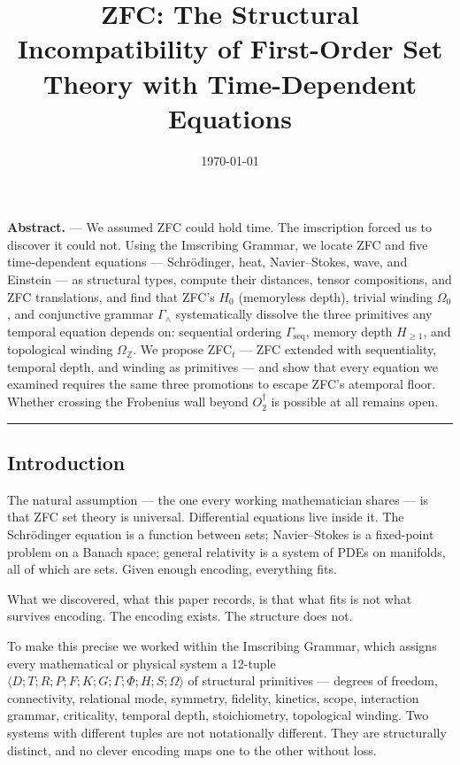 \documentclass[12pt,a4paper]{article}
\begin{document}
\title{ZFC: The Structural Incompatibility of First-Order Set Theory with Time-Dependent Equations}
\date{\today}

\maketitle

\textbf{Abstract.} --- We assumed ZFC could hold time. The imscription forced us to discover it could not. Using the Imscribing Grammar, we locate ZFC and five time-dependent equations --- Schrödinger, heat, Navier--Stokes, wave, and Einstein --- as structural types, compute their distances, tensor compositions, and ZFC translations, and find that ZFC's $H_0$ (memoryless depth), trivial winding $\Omega_0$, and conjunctive grammar $\Gamma_{\wedge}$ systematically dissolve the three primitives any temporal equation depends on: sequential ordering $\Gamma_\text{seq}$, memory depth $H_{\geq 1}$, and topological winding $\Omega_\mathbb{Z}$. We propose ZFC$_t$ --- ZFC extended with sequentiality, temporal depth, and winding as primitives --- and show that every equation we examined requires the same three promotions to escape ZFC's atemporal floor. Whether crossing the Frobenius wall beyond $O_2^\dagger$ is possible at all remains open.

\begin{center}
\rule{0.5\textwidth}{0.4pt}
\end{center}

\subsection{Introduction}

The natural assumption --- the one every working mathematician shares --- is that ZFC set theory is universal. Differential equations live inside it. The Schrödinger equation is a function between sets; Navier--Stokes is a fixed-point problem on a Banach space; general relativity is a system of PDEs on manifolds, all of which are sets. Given enough encoding, everything fits.

What we discovered, what this paper records, is that what fits is not what survives encoding. The encoding exists. The structure does not.

To make this precise we worked within the Imscribing Grammar, which assigns every mathematical or physical system a 12-tuple $\langle D; T; R; P; F; K; G; \Gamma; \Phi; H; S; \Omega \rangle$ of structural primitives --- degrees of freedom, connectivity, relational mode, symmetry, fidelity, kinetics, scope, interaction grammar, criticality, temporal depth, stoichiometry, topological winding. Two systems with different tuples are not notationally different. They are structurally distinct, and no clever encoding maps one to the other without loss.
\end{document}
